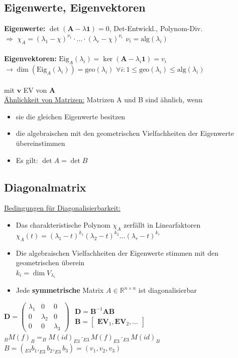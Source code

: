 \documentclass[6pt,a4paper]{scrartcl}
\newcommand{\mat}[1]{\ensuremath{\begin{bmatrix} #1 \end{bmatrix}}}								%
\newcommand{\ma}[1]{\ensuremath{\boldsymbol {#1}}}												%
\renewcommand{\vec}[1]{\ensuremath{\boldsymbol {#1}}}											%
\renewcommand{\emph}[1]{\textbf{#1}}															%
\newcommand{\Ra}[0]{\ensuremath{\Rightarrow}}									%
\newcommand{\ra}[0]{\ensuremath{\rightarrow}} 									%
\newcommand{\R}{\ensuremath{\mathbb R}}
\begin{document}
\begin{multicols*}{4}
\subsection{Eigenwerte, Eigenvektoren}
\emph{Eigenwerte:} $\det(\ma A - \lambda \ma 1) = 0$, Det-Entwickl., Polynom-Div. \\
$\Ra$ $\chi_A = (\lambda_1 - \chi)^{\nu_1} \cdot ... \cdot (\lambda_r - \chi)^{\nu_r}$ \quad $\nu_i = \mathrm{alg}(\lambda_i)$\\ \\
\emph{Eigenvektoren:} $\mathrm{Eig}_A (\lambda_i) = \ker(\ma A - \lambda_i \ma 1) = v_i$\\
$\ra \dim(\mathrm{Eig}_A (\lambda_i)) = \mathrm{geo}(\lambda_i)$ \quad $\forall i : 1 \le \mathrm{geo}(\lambda_i) \le \mathrm{alg}(\lambda_i)$\\ \\
\boxed{\ma A \vec v = \lambda \vec v} mit $\vec v$ EV von $\ma A$ \\
\underline{Ähnlichkeit von Matrizen:} Matrizen A und B sind ähnlich, wenn
\begin{itemize}
	\item sie die gleichen Eigenwerte besitzen
	\item die algebraischen mit den geometrischen Vielfachheiten der Eigenwerte übereinstimmen
	\item Es gilt: $\det A = \det B$
\end{itemize}

\subsection{Diagonalmatrix}

\underline{Bedingungen für Diagonalisierbarkeit:}
\begin{itemize} \itemsep0pt
	\item Das charakteristische Polynom $\chi_{A}$ zerfällt in Linearfaktoren\\
	$\chi_{A}(t) = (\lambda_1 - t)^{k_1}(\lambda_2 - t)^{k_2}\ldots(\lambda_r - t)^{k_r}$
	\item Die algebraischen Vielfachheiten der Eigenwerte stimmen mit den geometrischen überein\\
	$k_i = \dim V_{\lambda_i}$
	\item Jede \textbf{symmetrische} Matrix $A \in \R^{n \times n}$ ist diagonalisierbar
\end{itemize}

$\ma D = \begin{pmatrix} \lambda_1 & 0 & 0 \\ 0 & \lambda_2 & 0 \\ 0 & 0 & \lambda_3 \end{pmatrix}$ \qquad $\begin{array}{l} \ma D = \ma B^{-1} \ma A \ma B \\[0.5em] \ma B = \mat{\vec{EV}_1, \vec{EV}_2, ...} \end{array}$\\
$_B M(f)_B = _B M (id)_{E3} \cdot _{E3} M(f)_{E3} \cdot _{E3} M(id)_B$ \\
$B = ( _{E3} b_1 , _{E3} b_2 ,_{E3} b_3 ) = (v_1, v_2, v_3)$


\end{multicols*}
\end{document}
